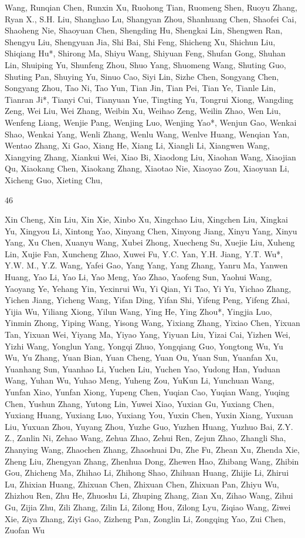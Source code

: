 \documentclass[
  10
]{article}
\begin{document}
Wang, Runqian Chen, Runxin Xu, Ruohong Tian, Ruomeng Shen, Ruoyu Zhang,
Ryan X., S.H. Liu, Shanghao Lu, Shangyan Zhou, Shanhuang Chen, Shaofei
Cai, Shaoheng Nie, Shaoyuan Chen, Shengding Hu, Shengkai Lin, Shengwen
Ran, Shengyu Liu, Shengyuan Jia, Shi Bai, Shi Feng, Shicheng Xu, Shichun
Liu, Shiqiang Hu*, Shirong Ma, Shiyu Wang, Shiyuan Feng, Shufan Gong,
Shuhan Lin, Shuiping Yu, Shunfeng Zhou, Shuo Yang, Shuomeng Wang,
Shuting Guo, Shuting Pan, Shuying Yu, Sinuo Cao, Siyi Lin, Sizhe Chen,
Songyang Chen, Songyang Zhou, Tao Ni, Tao Yun, Tian Jin, Tian Pei, Tian
Ye, Tianle Lin, Tianran Ji*, Tianyi Cui, Tianyuan Yue, Tingting Yu,
Tongrui Xiong, Wangding Zeng, Wei Liu, Wei Zhang, Weibin Xu, Weihao
Zeng, Weilin Zhao, Wen Liu, Wenfeng Liang, Wenjie Pang, Wenjing Luo,
Wenjing Yao*, Wenjun Gao, Wenkai Shao, Wenkai Yang, Wenli Zhang, Wenlu
Wang, Wenlve Huang, Wenqian Yan, Wentao Zhang, Xi Gao, Xiang He, Xiang
Li, Xiangli Li, Xiangwen Wang, Xiangying Zhang, Xiankui Wei, Xiao Bi,
Xiaodong Liu, Xiaohan Wang, Xiaojian Qu, Xiaokang Chen, Xiaokang Zhang,
Xiaotao Nie, Xiaoyao Zou, Xiaoyuan Li, Xicheng Guo, Xieting Chu,

46

Xin Cheng, Xin Liu, Xin Xie, Xinbo Xu, Xingchao Liu, Xingchen Liu,
Xingkai Yu, Xingyou Li, Xintong Yao, Xinyang Chen, Xinyong Jiang, Xinyu
Yang, Xinyu Yang, Xu Chen, Xuanyu Wang, Xubei Zhong, Xuecheng Su, Xuejie
Liu, Xuheng Lin, Xujie Fan, Xuncheng Zhao, Xuwei Fu, Y.C. Yan, Y.H.
Jiang, Y.T. Wu*, Y.W. M., Y.Z. Wang, Yafei Gao, Yang Yang, Yang Zhang,
Yanru Ma, Yanwen Huang, Yao Li, Yao Li, Yao Meng, Yao Zhao, Yaofeng Sun,
Yaohui Wang, Yaoyang Ye, Yehang Yin, Yexinrui Wu, Yi Qian, Yi Tao, Yi
Yu, Yichao Zhang, Yichen Jiang, Yicheng Wang, Yifan Ding, Yifan Shi,
Yifeng Peng, Yifeng Zhai, Yijia Wu, Yiliang Xiong, Yilun Wang, Ying He,
Ying Zhou*, Yingjia Luo, Yinmin Zhong, Yiping Wang, Yisong Wang, Yixiang
Zhang, Yixiao Chen, Yixuan Tan, Yixuan Wei, Yiyang Ma, Yiyao Yang,
Yiyuan Liu, Yizai Cai, Yizhen Wei, Yizhi Wang, Yonglun Yang, Yongqi
Zhuo, Yongqiang Guo, Yongtong Wu, Yu Wu, Yu Zhang, Yuan Bian, Yuan
Cheng, Yuan Ou, Yuan Sun, Yuanfan Xu, Yuanhang Sun, Yuanhao Li, Yuchen
Liu, Yuchen Yao, Yudong Han, Yuduan Wang, Yuhan Wu, Yuhao Meng, Yuheng
Zou, YuKun Li, Yunchuan Wang, Yunfan Xiao, Yunfan Xiong, Yupeng Chen,
Yuqian Cao, Yuqian Wang, Yuqing Chen, Yushun Zhang, Yutong Lin, Yuwei
Xiao, Yuxian Gu, Yuxiang Chen, Yuxiang Huang, Yuxiang Luo, Yuxiang You,
Yuxin Chen, Yuxin Xiang, Yuxuan Liu, Yuxuan Zhou, Yuyang Zhou, Yuzhe
Guo, Yuzhen Huang, Yuzhuo Bai, Z.Y. Z., Zanlin Ni, Zehao Wang, Zehua
Zhao, Zehui Ren, Zejun Zhao, Zhangli Sha, Zhanying Wang, Zhaochen Zhang,
Zhaoshuai Du, Zhe Fu, Zhean Xu, Zhenda Xie, Zheng Liu, Zhengyan Zhang,
Zhenhua Dong, Zhewen Hao, Zhibang Wang, Zhibin Gou, Zhicheng Ma, Zhihao
Li, Zhihong Shao, Zhihuan Huang, Zhijie Li, Zhirui Lu, Zhixian Huang,
Zhixuan Chen, Zhixuan Chen, Zhixuan Pan, Zhiyu Wu, Zhizhou Ren, Zhu He,
Zhuoshu Li, Zhuping Zhang, Zian Xu, Zihao Wang, Zihui Gu, Zijia Zhu,
Zili Zhang, Zilin Li, Zilong Hou, Zilong Lyu, Ziqiao Wang, Ziwei Xie,
Ziya Zhang, Ziyi Gao, Zizheng Pan, Zonglin Li, Zongqing Yao, Zui Chen,
Zuofan Wu
\end{document}
